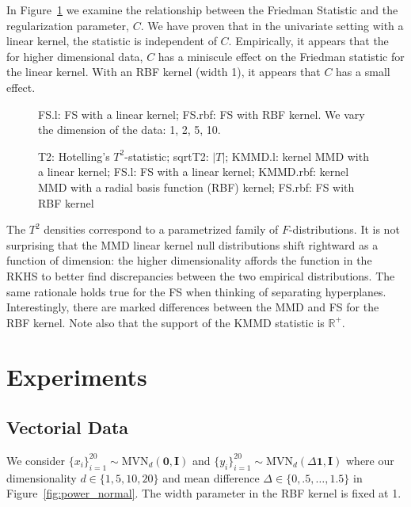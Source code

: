 In Figure~\ref{fig:c_param} we examine the relationship between the Friedman
Statistic and the regularization parameter, $C$.  We have proven that in
the univariate setting with a linear kernel, the statistic is independent of
$C$.  Empirically, it appears that the for higher dimensional data, $C$ has a
miniscule effect on the Friedman statistic for the linear kernel.  With an RBF
kernel (width 1), it appears that $C$ has a small effect.
\begin{figure}
  \begin{center}
    \resizebox{14.0cm}{!}{
      
    }
  \end{center}
\caption{FS.l: FS with a linear kernel; FS.rbf: FS with RBF kernel. We vary
the dimension of the data: 1, 2, 5, 10.}
\label{fig:c_param}
\end{figure}

\begin{figure}
  \begin{center}
    \resizebox{14.0cm}{!}{
      
    }
  \end{center}
\caption{T2: Hotelling's $T^2$-statistic; sqrtT2: $|T|$;
KMMD.l: kernel MMD with a linear kernel; FS.l: FS with a
linear kernel; KMMD.rbf: kernel MMD with a radial basis function (RBF) kernel;
FS.rbf: FS with RBF kernel}
\label{fig:null_dist}
\end{figure}

The $T^2$ densities correspond to a
parametrized family of $F$-distributions.  It is not surprising that the MMD
linear kernel null distributions shift rightward as a function of
dimension: the higher dimensionality affords the function in the RKHS
to better find discrepancies between the two empirical distributions.
The same rationale holds true for the FS when thinking of separating
hyperplanes.  Interestingly, there are marked differences between the
MMD and FS for the RBF kernel.  Note also that the support of the KMMD
statistic is $\mathbb{R}^+$.

\section{Experiments}
\subsection{Vectorial Data}
We consider $\{x_i\}_{i=1}^{20} \sim \mathrm{MVN}_d(\mathbf{0},
\mathbf{I})$ and $\{y_i\}_{i=1}^{20} \sim
\mathrm{MVN}_d(\Delta \mathbf{1}, \mathbf{I})$ where our
dimensionality $d \in \{1, 5, 10, 20\}$ and mean difference $\Delta \in
\{0, .5, \ldots, 1.5\}$ in Figure~\ref{fig:power_normal}.  The width
parameter in the RBF kernel is fixed at 1.

